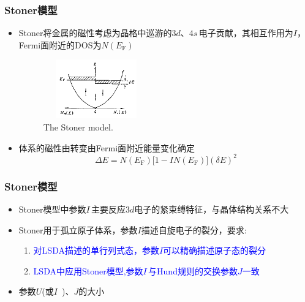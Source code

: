 \documentclass[cjk,slidestop,compress,mathserif,blue]{beamer}
\begin{document}
\frame
{
	\frametitle{\textrm{Stoner}模型}
	\begin{itemize}
		\item \textrm{Stoner}将金属的磁性考虑为晶格中巡游的$3d$、$4s$\,电子贡献，其相互作用为$I$，\textrm{Fermi}面附近的\textrm{DOS}为$N(E_{\mathrm F})$
\begin{figure}[h!]
\centering
\vspace*{-0.05in}
\includegraphics[height=1.0in,width=1.8in,viewport=0 0 800 380,clip]{Figures/Mag_Metal-T0.png}
\caption{\tiny \textrm{The Stoner model.}}%
\label{Mag_Metal-T0}
\end{figure}
		\item 体系的磁性由转变由\textrm{Fermi}面附近能量变化确定
			\begin{displaymath}
				\Delta E=N(E_{\mathrm F})\big[1-IN(E_{\mathrm F})\big](\delta E)^2
			\end{displaymath}
	\end{itemize}
}

\frame
{
	\frametitle{\textrm{Stoner}模型}
	\begin{itemize}
		\item \textrm{Stoner}模型中参数$I$\,主要反应$3d$电子的紧束缚特征，与晶体结构关系不大
		\item \textrm{Stoner}用于孤立原子体系，参数$I$描述自旋电子的裂分，要求:
			\begin{enumerate}
				\item \textcolor{blue}{对\textrm{LSDA}描述的单行列式态，参数$I$可以精确描述原子态的裂分}
				\item \textcolor{blue}{\textrm{LSDA}中应用\textrm{Stoner}模型,参数$I$\,与\textrm{Hund}规则的交换参数$J$一致}
			\end{enumerate}
		\item 参数$U$(或$I$~)、$J$的大小\\
	\end{itemize}
}
\end{document}

